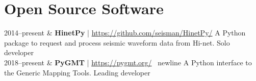 \section{Open Source Software}

\begin{EntriesTable}{0.18}{0.02}{0.8}
2014--present & \textbf{HinetPy} | \url{https://github.com/seisman/HinetPy/} \newline
                A Python package to request and process seismic waveform data from Hi-net. \newline
                Solo developer \\
2018--present & \textbf{PyGMT} | \url{https://pygmt.org/} \ newline
                A Python interface to the Generic Mapping Tools. \newline
                Leading developer \\
\end{EntriesTable}
